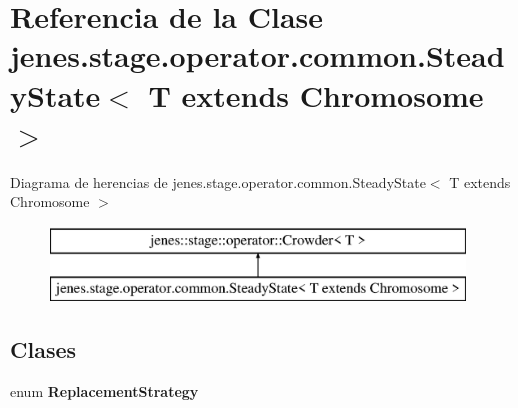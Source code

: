 \hypertarget{classjenes_1_1stage_1_1operator_1_1common_1_1_steady_state_3_01_t_01extends_01_chromosome_01_4}{\section{Referencia de la Clase jenes.\-stage.\-operator.\-common.\-Steady\-State$<$ T extends Chromosome $>$}
\label{classjenes_1_1stage_1_1operator_1_1common_1_1_steady_state_3_01_t_01extends_01_chromosome_01_4}
}
Diagrama de herencias de jenes.\-stage.\-operator.\-common.\-Steady\-State$<$ T extends Chromosome $>$\begin{figure}[H]
\begin{center}
\leavevmode
\includegraphics[height=2.000000cm]{classjenes_1_1stage_1_1operator_1_1common_1_1_steady_state_3_01_t_01extends_01_chromosome_01_4}
\end{center}
\end{figure}
\subsection*{Clases}
\begin{DoxyCompactItemize}
\item 
enum {\bfseries Replacement\-Strategy}
\end{DoxyCompactItemize}
